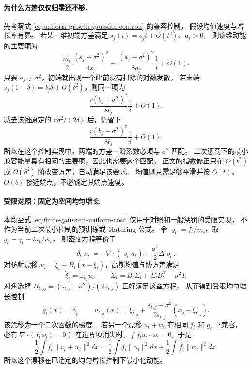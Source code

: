 \documentclass[UTF8,a4paper,11pt,fontset=fandol]{ctexart}
\begin{document}
\paragraph{为什么方差仅仅归零还不够.}
先考察式 \eqref{eq:uniform-growth-gaussian-controls} 的兼容控制，
假设均值速度与增长率有界。
若某一维初端方差满足 $s_j(t)=a_jt+O(t^2)$、$a_j>0$，
则该维动能的主要项为
\begin{equation}
\frac{m_t}{2}\,
\frac{(\dot s_j-\sigma^2)^2}{4s_j}
=\frac{(a_j-\sigma^2)^2}{8a_j}\frac1t+O(1).
\end{equation}
只要 $a_j\ne\sigma^2$，初端就出现一个此前没有扣除的对数发散。
若末端 $s_j(1-\delta)=b_j\delta+O(\delta^2)$，则同一项为
\begin{equation}
\frac{r(b_j+\sigma^2)^2}{8b_j}\frac1\delta+O(1).
\end{equation}
减去该维原定的 $r\sigma^2/(2\delta)$ 后，仍留下
\begin{equation}
\frac{r(b_j-\sigma^2)^2}{8b_j}\frac1\delta+O(1).
\end{equation}
所以在这个控制实现中，两端的方差一阶系数必须与 $\sigma^2$ 匹配。
二次惩罚下的最小兼容能量具有相同的主要项，因此也需要这个匹配。
正文的指数修正只在 $O(t^2)$ 或 $O(\delta^2)$ 阶改变方差，自动满足该要求。
均值则只需足够平滑并按 $O(t)$、$O(\delta)$ 接近端点，不必锁定其端点速度。

\paragraph{受限对照：固定为空间均匀增长.}
本段至式 \eqref{eq:finite-gaussian-uniform-cost} 仅用于对照和一般惩罚的受限实现，
不作为当前二次最小控制的预训练或 Matching 公式。
令 $\varrho_t=f_t/m_t$，取 $g_t=\gamma_t=\dot m_t/m_t$，
则密度方程等价于
\begin{equation}
\partial_t\varrho_t=-\nabla\cdot(\varrho_tu_t)+\frac{\sigma^2}{2}\Delta\varrho_t.
\end{equation}
对仿射漂移 $u_t=\dot\xi_t+B_t(x-\xi_t)$，高斯均值与协方差满足
\begin{equation}
\dot\xi_t=\mathbb E_{\varrho_t}u_t,\qquad
\dot\Sigma_t=B_t\Sigma_t+\Sigma_tB_t^\top+\sigma^2I.
\end{equation}
对角选择 $B_{t,jj}=(\dot s_{t,j}-\sigma^2)/(2s_{t,j})$ 正好满足这些方程，
从而得到受限均匀增长控制
\begin{equation}
g_t(x)=\gamma_t,\qquad
u_{t,j}(x)=\dot\xi_{t,j}+\frac{\dot s_{t,j}-\sigma^2}{2s_{t,j}}(x_j-\xi_{t,j}).
\label{eq:uniform-growth-gaussian-controls}
\end{equation}
该漂移为一个二次函数的梯度。
若另一个漂移 $u_t+w_t$ 在相同 $f_t$ 和 $g_t$ 下兼容，必有 $\nabla\cdot(f_tw_t)=0$；
在边界项消失时，$\int f_tu_t\cdot w_t=0$，于是
\begin{equation}
\frac12\int f_t\|u_t+w_t\|^2dx
=\frac12\int f_t\|u_t\|^2dx+\frac12\int f_t\|w_t\|^2dx.
\end{equation}
所以这个漂移在已选定的均匀增长控制下最小化动能。
\end{document}
